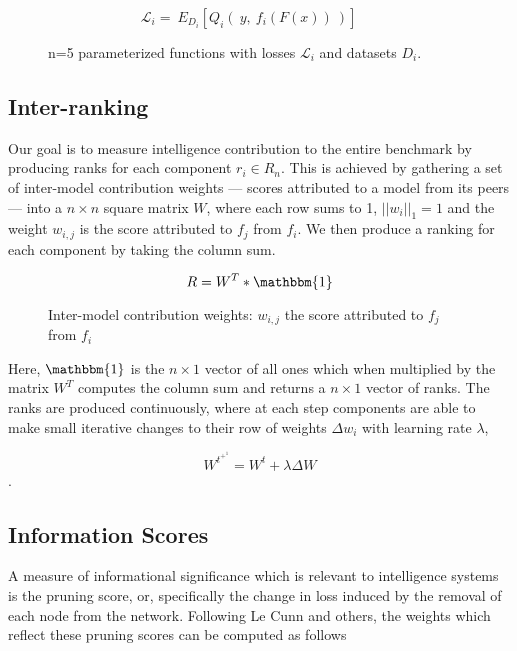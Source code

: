 \documentclass{article}
\begin{document}
\[ \mathcal{L}_i = \  E_{D_i}[Q_i( \ y, \ f_i(F(x)) \ )]  \ \ \ \  \textrm{ } \]


\begin{figure}[H]
    \centering
    \hspace*{-2cm}
    
    \label{fig:progdense_diagram}
    \caption{n=5 parameterized functions with losses $\mathcal{L}_i$ and datasets $D_i$.}
\end{figure}{}

\subsection{Inter-ranking}

Our goal is to measure intelligence contribution to the entire benchmark by producing ranks for each component $r_i \in R_n$. This is achieved by gathering a set of inter-model contribution weights --- scores attributed to a model from its peers --- into a $n \times n$ square matrix $W$, where each row sums to 1, $||w_i||_1 = 1$ and the weight $w_{i,j}$ is the score attributed to $f_j$ from $f_i$. We then produce a ranking for each component by taking the column sum. 
\bigskip

\[ R = W^T * \mathbbm{1}  \]

 \begin{figure}[H]
    \centering
    \hspace*{-2cm}
    
    \label{fig:progdense_diagram}
    \caption{Inter-model contribution weights: $w_{i,j}$ the score attributed to $f_j$ from $f_i$}
\end{figure}{}

Here, $\mathbbm{1}$ is the $n \times 1$ vector of all ones which when multiplied by the matrix $W^T$ computes the column sum and returns a $n \times 1$ vector of ranks. The ranks are produced continuously, where at each step components are able to make small iterative changes to their row of weights $\Delta w_i$ with learning rate $\lambda$,

\[ W^t^+^1 = W^t + \lambda \Delta W \].

\subsection{Information Scores}

A measure of informational significance which is relevant to intelligence systems is the pruning score, or, specifically the change in loss induced by the removal of each node from the network. Following Le Cunn and others, the weights which reflect these pruning scores can be computed as follows
\bigskip
\end{document}
